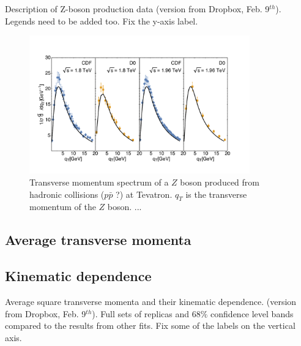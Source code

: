 \documentclass[aps,preprintnumbers,showpacs,nofootinbib,superscriptaddress,floatfix]{revtex4}
\begin{document}
Description of Z-boson production data (version from Dropbox, Feb. 9$^{th}$).
Legends need to be added too. Fix the y-axis label.
\begin{figure}[h!]
\begin{center}
\includegraphics[width=0.85\textwidth]{plots/DY-Z/Z_SCIplot_flINDEP.pdf}
\end{center}
\caption{Transverse momentum spectrum of a $Z$ boson produced from hadronic collisions ($p\bar{p}$ ?) at Tevatron. $q_T$ is the transverse momentum of the $Z$ boson. ... } 
\label{f:Z_qT}
\end{figure}





\subsection{Average transverse momenta}
\label{ss:kT2_PT2}


\subsection{Kinematic dependence}
\label{ss:kindep}

Average square transverse momenta and their kinematic dependence.  (version from Dropbox, Feb. 9$^{th}$).
Full sets of replicas and $68\%$ confidence level bands compared to the results from other fits.
Fix some of the labels on the vertical axis.
\end{document}
